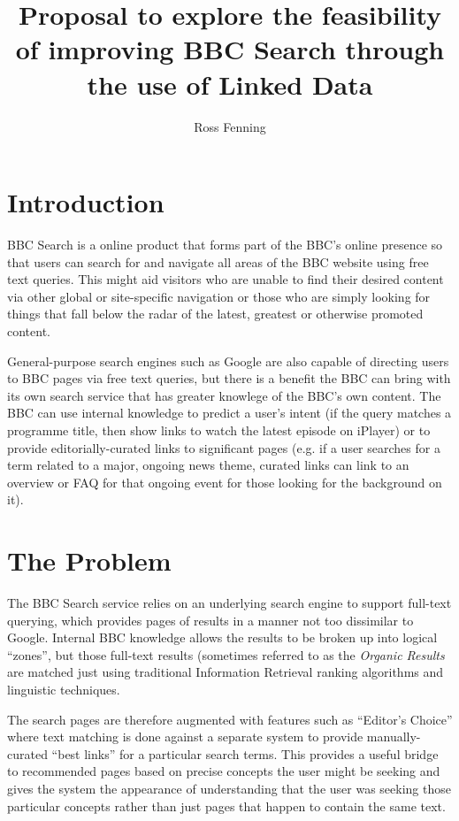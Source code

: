 \documentclass[10pt,a4paper]{article}
\title{Proposal to explore the feasibility of improving BBC Search through the use of Linked Data}
\author{Ross Fenning}
\begin{document}
\maketitle
\thispagestyle{empty}

\section{Introduction}

BBC Search is a online product that forms part of the BBC's online presence so
that users can search for and navigate all areas of the BBC website using
free text queries. This might aid visitors who are unable to find their desired
content via other global or site-specific navigation or those who are simply
looking for things that fall below the radar of the latest, greatest or
otherwise promoted content.

General-purpose search engines such as Google are also capable of directing
users to BBC pages via free text queries, but there is a benefit the BBC
can bring with its own search service that has greater knowlege of the
BBC's own content. The BBC can use internal knowledge to predict a user's
intent (if the query matches a programme title, then show links to watch
the latest episode on iPlayer) or to provide editorially-curated
links to significant pages (e.g. if a user searches for a term
related to a major, ongoing news theme, curated links can
link to an overview or FAQ for that ongoing event for those
looking for the background on it).

\section{The Problem}

The BBC Search service relies on an underlying search engine to support
full-text querying, which provides pages of results in a manner not
too dissimilar to Google. Internal BBC knowledge allows the results
to be broken up into logical ``zones'', but those full-text results
(sometimes referred to as the \emph{Organic Results} are matched
just using traditional Information Retrieval ranking
algorithms and linguistic techniques.

The search pages are therefore augmented with features such as
``Editor's Choice'' where text matching is done against a separate
system to provide manually-curated ``best links'' for a particular
search terms. This provides a useful bridge to recommended pages based
on precise concepts the user might be seeking and gives the system
the appearance of understanding that the user was seeking those
particular concepts rather than just pages that happen to contain
the same text.
\end{document}
